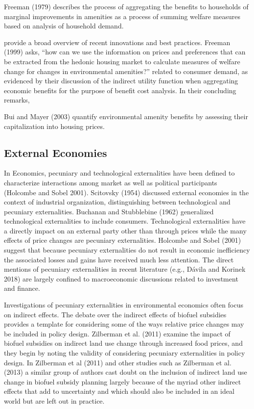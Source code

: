 \documentclass[ecta,nameyear,draft]{econsocart}
\theoremstyle{plain}
\theoremstyle{remark}
\begin{document}
Freeman (1979) describes the process of aggregating the benefits to households of marginal improvements in amenities as a process of summing welfare measures based on analysis of household demand. 



 
\cite{bishop20} provide a broad overview of recent innovations and best practices.
 Freeman (1999) asks, “how can we use the information on prices and preferences that can be extracted from the hedonic housing market to calculate  measures of welfare change for changes in environmental amenities?” 
 related to consumer demand, as evidenced by their discussion of the indirect utility function when aggregating economic benefits for the purpose of benefit cost analysis. In their concluding remarks, 

Bui and Mayer (2003) quantify environmental amenity benefits by assessing their capitalization into housing prices. 




\subsection{External Economies} 

In Economics, pecuniary and technological externalities have been defined to characterize interactions among market as well as political participants (Holcombe and Sobel 2001). Scitovsky (1954) discussed external economies in the context of industrial organization, distinguishing between technological and pecuniary externalities. Buchanan and Stubblebine (1962) generalized technological externalities to include consumers. Technological externalities have a directly impact on an external party other than through prices while the many effects of price changes are pecuniary externalities. Holcombe and Sobel (2001) suggest that because pecuniary externalities do not result in economic inefficiency the associated losses and gains have received much less attention. The direct mentions of pecuniary externalities in recent literature (e.g., Dávila and Korinek 2018) are largely confined to macroeconomic discussions related to investment and finance. 

Investigations of pecuniary externalities in environmental economics often focus on indirect effects. The debate over the indirect effects of biofuel subsidies provides a template for considering some of the ways relative price changes may be included in policy design. Zilberman et al. (2011) examine the impact of biofuel subsidies on indirect land use change through increased food prices, and they begin by noting the validity of considering pecuniary externalities in policy design. In Zilberman et al (2011) and other studies such as Zilberman et al. (2013) a similar group of authors cast doubt on the inclusion of indirect land use change in biofuel subsidy planning largely because of the myriad other indirect effects that add to uncertainty and which should also be included in an ideal world but are left out in practice. 
\end{document}
